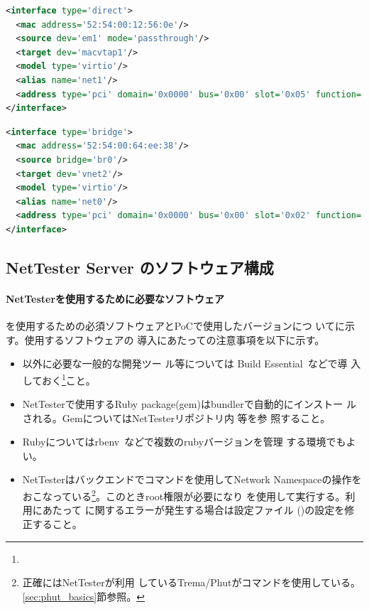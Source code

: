 \begin{lstlisting}[language=xml,caption=PSW接続用ポート設定,label=lst:kvmconf-psw-port]
<interface type='direct'>
  <mac address='52:54:00:12:56:0e'/>
  <source dev='em1' mode='passthrough'/>
  <target dev='macvtap1'/>
  <model type='virtio'/>
  <alias name='net1'/>
  <address type='pci' domain='0x0000' bus='0x00' slot='0x05' function='0x0'/>
</interface>
\end{lstlisting}
\begin{lstlisting}[language=xml,caption=管理ポート設定,label=lst:kvmconf-mgmt-port]
<interface type='bridge'>
  <mac address='52:54:00:64:ee:38'/>
  <source bridge='br0'/>
  <target dev='vnet2'/>
  <model type='virtio'/>
  <alias name='net0'/>
  <address type='pci' domain='0x0000' bus='0x00' slot='0x02' function='0x0'/>
</interface>
\end{lstlisting}


  \subsection{NetTester Server のソフトウェア構成}
  \label{sec:nettester-server-software}


    \paragraph{NetTesterを使用するために必要なソフトウェア}
\nettester を使用するための必須ソフトウェアとPoCで使用したバージョンにつ
いてに示す。使用するソフトウェアの
導入にあたっての注意事項を以下に示す。
\begin{itemize}
 \item {}以外に必要な一般的な開発ツー
       ル等については Build Essential~\cite{build-essential-doc}などで導
       入しておく\footnote{}こと。
 \item NetTesterで使用するRuby package(gem)はbundlerで自動的にインストー
       ルされる。GemについてはNetTesterリポジトリ内 等を参
       照すること。
 \item Rubyについてはrbenv~\cite{rbenv}などで複数のrubyバージョンを管理
       する環境でもよい。
 \item NetTesterはバックエンドでコマンドを使用してNetwork
       Namespaceの操作をおこなっている\footnote{正確にはNetTesterが利用
       しているTrema/Phutがコマンドを使用している。
       \ref{sec:phut_basics}節参照。}。このときroot権限が必要になり
       を使用して実行する。利用にあたって
       に関するエラーが発生する場合は設定ファイル
       ()の設定を修正すること。
\end{itemize}

